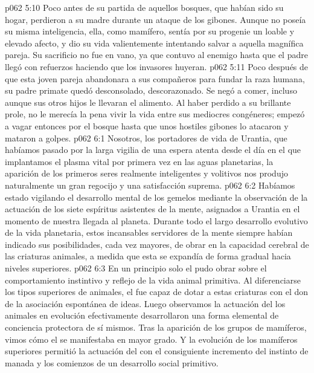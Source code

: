\vs p062 5:10 Poco antes de su partida de aquellos bosques, que habían sido su hogar, perdieron a su madre durante un ataque de los gibones. Aunque no poseía su misma inteligencia, ella, como mamífero, sentía por su progenie un loable y elevado afecto, y dio su vida valientemente intentando salvar a aquella magnífica pareja. Su sacrificio no fue en vano, ya que contuvo al enemigo hasta que el padre llegó con refuerzos haciendo que los invasores huyeran.
\vs p062 5:11 Poco después de que esta joven pareja abandonara a sus compañeros para fundar la raza humana, su padre primate quedó desconsolado, descorazonado. Se negó a comer, incluso aunque sus otros hijos le llevaran el alimento. Al haber perdido a su brillante prole, no le merecía la pena vivir la vida entre sus mediocres congéneres; empezó a vagar entonces por el bosque hasta que unos hostiles gibones lo atacaron y mataron a golpes.
\vs p062 6:1 Nosotros, los portadores de vida de Urantia, que habíamos pasado por la larga vigilia de una espera atenta desde el día en el que implantamos el plasma vital por primera vez en las aguas planetarias, la aparición de los primeros seres realmente inteligentes y volitivos nos produjo naturalmente un gran regocijo y una satisfacción suprema.
\vs p062 6:2 Habíamos estado vigilando el desarrollo mental de los gemelos mediante la observación de la actuación de los siete espíritus asistentes de la mente, asignados a Urantia en el momento de nuestra llegada al planeta. Durante todo el largo desarrollo evolutivo de la vida planetaria, estos incansables servidores de la mente siempre habían indicado sus posibilidades, cada vez mayores, de obrar en la capacidad cerebral de las criaturas animales, a medida que esta se expandía de forma gradual hacia niveles superiores.
\vs p062 6:3 En un principio solo el  pudo obrar sobre el comportamiento instintivo y reflejo de la vida animal primitiva. Al diferenciarse los tipos superiores de animales, el  fue capaz de dotar a estas criaturas con el don de la asociación espontánea de ideas. Luego observamos la actuación del  los animales en evolución efectivamente desarrollaron una forma elemental de conciencia protectora de sí mismos. Tras la aparición de los grupos de mamíferos, vimos cómo el  se manifestaba en mayor grado. Y la evolución de los mamíferos superiores permitió la actuación del  con el consiguiente incremento del instinto de manada y los comienzos de un desarrollo social primitivo.
